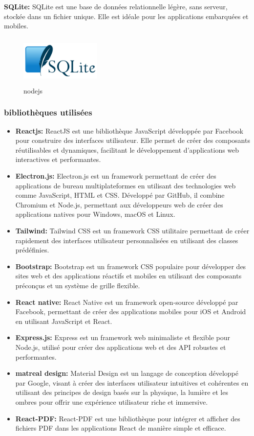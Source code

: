 \documentclass[edit,12pt,a4paper,ChapStyle,oneside,doubleinterligne]{report}
\begin{document}
\textbf{SQLite: }SQLite est une base de données relationnelle légère, sans serveur, stockée dans un fichier unique. Elle est idéale pour les applications embarquées et mobiles\cite{sqlite}.
    \begin{figure}[H]\label{fig:nodejs}
        \centering
        \includegraphics[width=4cm , height = 2.5cm , angle=360]{images/SQLite370.png}
        \caption{nodejs}
        \end{figure}
\subsubsection{bibliothèques utilisées}
\begin{itemize}
    \item \textbf{Reactjs: }ReactJS est une bibliothèque JavaScript développée par Facebook pour construire des interfaces utilisateur. Elle permet de créer des composants réutilisables et dynamiques, facilitant le développement d'applications web interactives et performantes\cite{reactjs}.
    \item \textbf{Electron.js: }Electron.js est un framework permettant de créer des applications de bureau multiplateformes en utilisant des technologies web comme JavaScript, HTML et CSS. Développé par GitHub, il combine Chromium et Node.js, permettant aux développeurs web de créer des applications natives pour Windows, macOS et Linux\cite{electron}.
    \item \textbf{Tailwind: }Tailwind CSS est un framework CSS utilitaire permettant de créer rapidement des interfaces utilisateur personnalisées en utilisant des classes prédéfinies.\cite{tailwind}
    \item \textbf{Bootstrap: }Bootstrap est un framework CSS populaire pour développer des sites web et des applications réactifs et mobiles en utilisant des composants préconçus et un système de grille flexible.\cite{Bootstrap}
    \item \textbf{React native: }React Native est un framework open-source développé par Facebook, permettant de créer des applications mobiles pour iOS et Android en utilisant JavaScript et React.\cite{reactn}
    \item \textbf{Express.js: }Express est un framework web minimaliste et flexible pour Node.js, utilisé pour créer des applications web et des API robustes et performantes.\cite{express}
    \item \textbf{matreal design: }Material Design est un langage de conception développé par Google, visant à créer des interfaces utilisateur intuitives et cohérentes en utilisant des principes de design basés sur la physique, la lumière et les ombres pour offrir une expérience utilisateur riche et immersive\cite{matreal}.
    \item \textbf{React-PDF: }React-PDF est une bibliothèque pour intégrer et afficher des fichiers PDF dans les applications React de manière simple et efficace.
\end{itemize}
\end{document}
